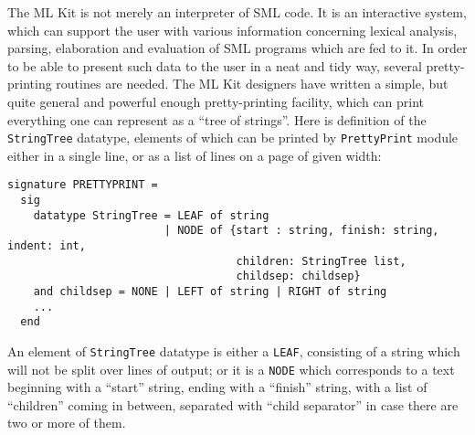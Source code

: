 The ML Kit is not merely an interpreter of SML code. It is an interactive
system, which can support the user with various information concerning 
lexical analysis, parsing, elaboration and evaluation of SML programs 
which are fed to it.
In order to be able to present such data to the user in a neat and tidy
way, several pretty-printing routines are needed.
The ML Kit designers have written a simple, but quite general and powerful enough
pretty-printing facility, which can print everything one can
represent as a ``tree of strings''.
Here is definition of the {\tt StringTree} datatype, elements of which
can be printed by {\tt PrettyPrint} module either in a single line, or as 
a list of lines on a page of given width:
{\small
\begin{verbatim}
signature PRETTYPRINT =
  sig
    datatype StringTree = LEAF of string
                        | NODE of {start : string, finish: string, indent: int,
                                   children: StringTree list,
                                   childsep: childsep}
    and childsep = NONE | LEFT of string | RIGHT of string
    ...
  end
\end{verbatim}
}
An element of {\tt StringTree} datatype is either a {\tt LEAF}, 
consisting of a string which will not be split over lines of output;
or it is a {\tt NODE} which corresponds to a text beginning with  
a ``start'' string, ending with a ``finish'' string, with a list of
``children'' coming in between, separated with ``child separator'' in
case there are two or more of them.

